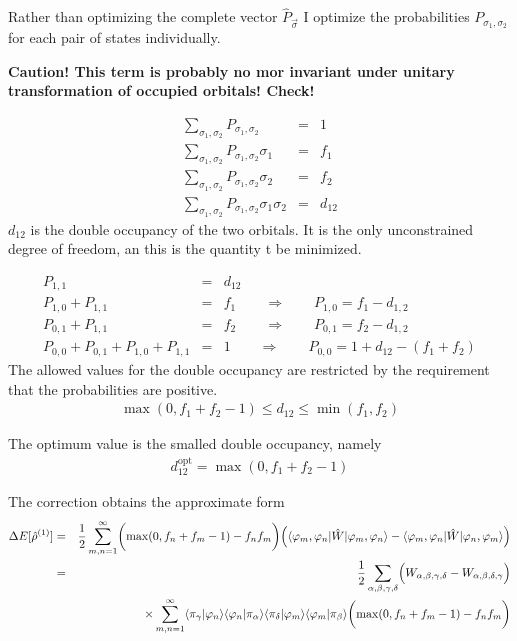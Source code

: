 \documentclass[11pt,a4paper]{report}
\begin{document}
Rather than optimizing the complete vector $\hat{P}_{\vec{\sigma}}$ I
optimize the probabilities $P_{\sigma_1,\sigma_2}$ for each pair of
states individually. 

\textbf{Caution! This term is probably no mor invariant under unitary
  transformation of occupied orbitals! Check!}



\begin{eqnarray}
\sum_{\sigma_1,\sigma_2}P_{\sigma_1,\sigma_2}&=&1
\nonumber\\
\sum_{\sigma_1,\sigma_2}P_{\sigma_1,\sigma_2}\sigma_1&=&f_1
\nonumber\\
\sum_{\sigma_1,\sigma_2}P_{\sigma_1,\sigma_2}\sigma_2&=&f_2
\nonumber\\
\sum_{\sigma_1,\sigma_2}P_{\sigma_1,\sigma_2}\sigma_1\sigma_2&=&d_{12}
\end{eqnarray}
$d_{12}$ is the double occupancy of the two orbitals. It is the only
unconstrained degree of freedom, an this is the quantity t be
minimized.

\begin{eqnarray}
P_{1,1}&=& d_{12}
\nonumber\\
P_{1,0}+P_{1,1}&=& f_1\qquad\Rightarrow\qquad P_{1,0}=f_1-d_{1,2}
\nonumber\\
P_{0,1}+P_{1,1}&=& f_2 \qquad\Rightarrow\qquad P_{0,1}=f_2-d_{1,2}
\nonumber\\
P_{0,0}+P_{0,1}+P_{1,0}+P_{1,1}&=& 1
\qquad\Rightarrow\qquad P_{0,0}=1+d_{12}-(f_1+f_2)
\end{eqnarray}
The allowed values for the double occupancy are restricted by the
requirement that the probabilities are positive.
\begin{eqnarray}
\max(0,f_1+f_2-1)\le d_{12} \le \min(f_1,f_2)
\end{eqnarray}

The optimum value is the smalled double occupancy, namely
\begin{eqnarray}
d_{12}^{\text{opt}}=\max(0,f_1+f_2-1)
\end{eqnarray}

The correction obtains the approximate form
\begin{eqnarray}
\Delta{E}[\hat{\rho}^{(1)}]
&=&
\frac{1}{2}\sum_{m,n=1}^\infty
\biggl(\max(0,f_n+f_m-1)-f_nf_m\biggr)
\Bigl(\langle\varphi_m,\varphi_n|\hat{W}|\varphi_m,\varphi_n\rangle 
-\langle\varphi_m,\varphi_n|\hat{W}|\varphi_n,\varphi_m\rangle 
\Bigr)
\nonumber\\
&=&
\frac{1}{2}
\sum_{\alpha,\beta,\gamma,\delta} 
\Bigl(W_{\alpha,\beta,\gamma,\delta}-W_{\alpha,\beta,\delta,\gamma}\Bigr)
\nonumber\\
&&\times\sum_{m,n=1}^\infty
\langle\pi_\gamma|\varphi_n\rangle\langle\varphi_n|\pi_\alpha\rangle
\langle\pi_\delta|\varphi_m\rangle\langle\varphi_m|\pi_\beta\rangle
\biggl(\max(0,f_n+f_m-1)-f_nf_m\biggr)
\nonumber\\
\end{eqnarray}
\end{document}
